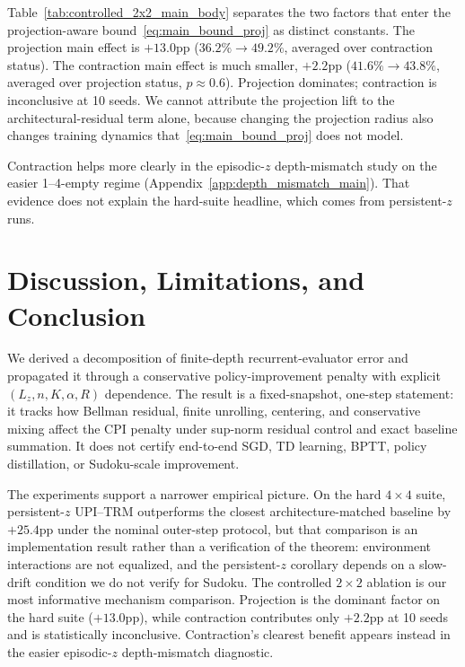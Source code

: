 \documentclass{article}
\theoremstyle{plain}
\theoremstyle{definition}
\theoremstyle{remark}
\begin{document}
Table~\ref{tab:controlled_2x2_main_body} separates the two factors that enter the projection-aware bound~\eqref{eq:main_bound_proj} as distinct constants. The projection main effect is $+13.0$pp ($36.2\%\to 49.2\%$, averaged over contraction status). The contraction main effect is much smaller, $+2.2$pp ($41.6\%\to 43.8\%$, averaged over projection status, $p\approx 0.6$). Projection dominates; contraction is inconclusive at 10 seeds. We cannot attribute the projection lift to the architectural-residual term alone, because changing the projection radius also changes training dynamics that~\eqref{eq:main_bound_proj} does not model.

Contraction helps more clearly in the episodic-$z$ depth-mismatch study on the easier 1--4-empty regime (Appendix~\ref{app:depth_mismatch_main}). That evidence does not explain the hard-suite headline, which comes from persistent-$z$ runs.

\section{Discussion, Limitations, and Conclusion}
\label{sec:conclusion}

We derived a decomposition of finite-depth recurrent-evaluator error and propagated it through a conservative policy-improvement penalty with explicit $(L_z,n,K,\alpha,R)$ dependence. The result is a fixed-snapshot, one-step statement: it tracks how Bellman residual, finite unrolling, centering, and conservative mixing affect the CPI penalty under sup-norm residual control and exact baseline summation. It does not certify end-to-end SGD, TD learning, BPTT, policy distillation, or Sudoku-scale improvement.

The experiments support a narrower empirical picture. On the hard $4\times4$ suite, persistent-$z$ UPI--TRM outperforms the closest architecture-matched baseline by $+25.4$pp under the nominal outer-step protocol, but that comparison is an implementation result rather than a verification of the theorem: environment interactions are not equalized, and the persistent-$z$ corollary depends on a slow-drift condition we do not verify for Sudoku. The controlled $2\times 2$ ablation is our most informative mechanism comparison. Projection is the dominant factor on the hard suite ($+13.0$pp), while contraction contributes only $+2.2$pp at 10 seeds and is statistically inconclusive. Contraction's clearest benefit appears instead in the easier episodic-$z$ depth-mismatch diagnostic.
\end{document}

